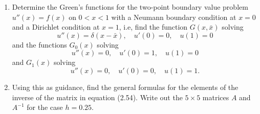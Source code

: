 

\begin{enumerate} 
\item
Determine the Green's functions for the two-point boundary
value problem $u''(x) = f(x)$ on $0<x<1$ with a Neumann boundary condition
at $x=0$ and a Dirichlet condition at $x=1$, i.e, find the function
$G(x,\bar x)$ solving
\[
u''(x) = \delta(x-\bar x), \quad u'(0)=0, \quad u(1)=0
\]
and the functions $G_0(x)$ solving
\[
u''(x) = 0, \quad u'(0)=1, \quad u(1)=0
\]
and $G_1(x)$ solving
\[
u''(x) = 0, \quad u'(0)=0, \quad u(1)=1.
\]

\item 
Using this as guidance, find the general formulas for the elements of the
inverse of the matrix in equation (2.54).  Write out the $5\times 5$ matrices
$A$ and $A^{-1}$ for the case $h=0.25$.
\end{enumerate} 
